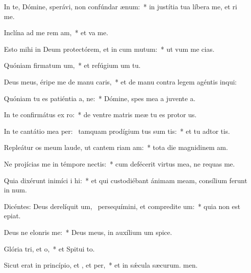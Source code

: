 \item In te, Dómine, sperávi, non confúndar  ænum:~* in justítia tua líbera me, et ri me.
\item Inclína ad me rem am,~* et va me.
\item Esto mihi in Deum protectórem, et in cum mutum:~* ut vum me cias.
\item Quóniam firmatum um,~* et refúgium um  tu.
\item Deus meus, éripe me de manu caris,~* et de manu contra legem agéntis  inqui:
\item Quóniam tu es patiéntia a, ne:~* Dómine, spes mea a juvente a.
\item In te confirmátus  ex ro:~* de ventre matris meæ tu es protor us.
\item In te cantátio mea per:~\pscross{} tamquam prodígium tus sum tis:~* et tu adtor tis.
\item Repleátur os meum laude, ut cantem riam am:~* tota die magnidinem am.
\item Ne projícias me in témpore nectis:~* cum defécerit virtus mea, ne requas me.
\item Quia dixérunt inimíci i hi:~* et qui custodiébant ánimam meam, consílium ferunt in num.
\item Dicéntes: Deus derelíquit um,~\pscross{} persequímini, et compredite um:~* quia non est  epiat.
\item Deus ne elonris  me:~* Deus meus, in auxílium um spice.
\item Glória tri, et o,~* et Spitui to.
\item Sicut erat in princípio, et , et per,~* et in sǽcula sæcurum. men.
